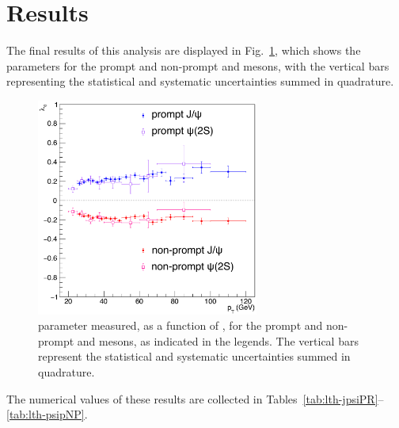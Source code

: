 \section{Results}
\label{sec:results}

The final results of this analysis are displayed in Fig.~\ref{fig:results},
which shows the \lth parameters for the prompt and non-prompt \jpsi and \psip mesons,
with the vertical bars representing the statistical and systematic uncertainties 
summed in quadrature.

\begin{figure}[h]
\centering
\includegraphics[width=0.65\textwidth]{Figures/chapter7/lth-PR-NP-jpsi-psip-final.pdf}
\caption{\lth parameter measured, as a function of \pt, 
for the prompt and non-prompt \jpsi and \psip mesons,
as indicated in the legends.
The vertical bars represent the statistical and systematic uncertainties 
summed in quadrature.}
\label{fig:results}
\end{figure}

The numerical values of these results are collected in 
Tables~\ref{tab:lth-jpsiPR}--\ref{tab:lth-psipNP}.

